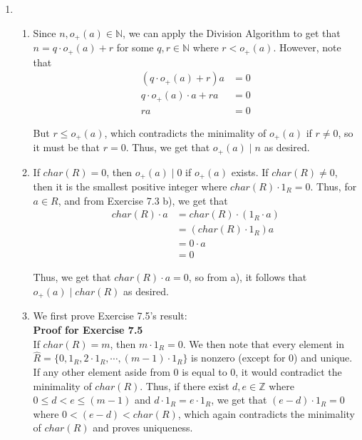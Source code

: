 \documentclass{article}
\begin{document}
\begin{enumerate}

\item

\begin{enumerate}
    \item
    Since $n, o_+(a) \in \mathbb{N}$, we can apply the Division Algorithm to get that $n = q\cdot o_+(a) + r$ for some $q, r \in \mathbb{N}$ where $r < o_+(a)$. However, note that 
    \begin{align*}
      (q\cdot o_+(a) + r)a &= 0  \\
      q\cdot o_+(a)\cdot a + ra &= 0 \\
      ra &= 0 
    \end{align*}
    
    But $r \leq o_+(a)$, which contradicts the minimality of $o_+(a)$ if $r \not = 0$, so it must be that $ r = 0$. Thus, we get that $o_+(a) \mid n$ as desired. \\

    \item 
    If $char(R) = 0$, then $ o_+(a) \mid 0$ if $o_+(a)$ exists. If $char(R) \not = 0$, then it is the smallest positive integer where $char(R) \cdot 1_R = 0$. Thus, for $a \in R$, and from Exercise 7.3 b), we get that 
    \begin{align*}
        char(R) \cdot a &= char(R) \cdot (1_R \cdot a) \\
        &= (char(R) \cdot 1_R) a \\
        &= 0 \cdot a\\
        &= 0
    \end{align*}

    Thus, we get that $char(R) \cdot a = 0$, so from a), it follows that $o_+(a) \mid char(R)$ as desired. \\

    \item 
    We first prove Exercise 7.5's result: \\

    \textbf{Proof for Exercise 7.5} \\

    If $char(R) = m$, then $m \cdot 1_R = 0$. We then note that every element in $\hat{R} = \{ 0, 1_R, 2\cdot 1_R, \cdots , (m-1)\cdot 1_R \}$ is nonzero (except for $0$) and unique. If any other element aside from $0$ is equal to $0$, it would contradict the minimality of $char(R)$. Thus, if there exist $d, e \in \mathbb{Z}$ where $0 \leq d < e \leq (m-1)$ and $d \cdot 1_R = e \cdot 1_R$, we get that $(e - d) \cdot 1_R = 0$ where $0 < (e - d) < char(R)$, which again contradicts the minimality of $char(R)$ and proves uniqueness. \\
    

\end{enumerate}
\end{enumerate}
\end{document}

